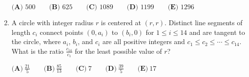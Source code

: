 \documentclass{article}
\begin{document}
\begin{enumerate}[label=\arabic*., itemsep=0.5em]
$\textbf{(A) }500\qquad\textbf{(B) }625\qquad\textbf{(C) }1089\qquad\textbf{(D) }1199\qquad\textbf{(E) }1296$\par \vspace{0.5em}\item A circle with integer radius $r$ is centered at $(r, r)$. Distinct line segments of length $c_i$ connect points $(0, a_i)$ to $(b_i, 0)$ for $1 \le i \le 14$ and are tangent to the circle, where $a_i$, $b_i$, and $c_i$ are all positive integers and $c_1 \le c_2 \le \cdots \le c_{14}$. What is the ratio $\frac{c_{14}}{c_1}$ for the least possible value of $r$?

$\textbf{(A)} ~\frac{21}{5} \qquad\textbf{(B)} ~\frac{85}{13} \qquad\textbf{(C)} ~7 \qquad\textbf{(D)} ~\frac{39}{5} \qquad\textbf{(E)} ~17 $\par \vspace{0.5em}\end{enumerate}
\end{document}
